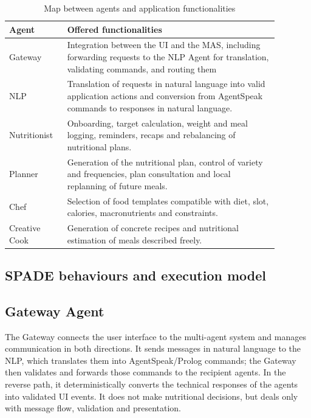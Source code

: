 \documentclass[12pt,a4paper]{article}
\newcommand{\toprule}{\hline}
\newcommand{\midrule}{\hline}
\newcommand{\bottomrule}{\hline}
\begin{document}
\begin{table}[H]
\centering
\begin{tabular}{p{0.18\linewidth}p{0.70\linewidth}}
\toprule
Agent & Offered functionalities \\
\midrule
Gateway
& Integration between the UI and the MAS, including forwarding requests to the NLP Agent for translation, validating commands, and routing them \\

NLP
& Translation of requests in natural language into valid
application actions and conversion from AgentSpeak commands to responses in natural language. \\

Nutritionist
& Onboarding, target calculation, weight and meal logging, reminders,
recaps and rebalancing of nutritional plans. \\

Planner
& Generation of the nutritional plan, control of variety and frequencies,
plan consultation and local replanning of future meals. \\

Chef
& Selection of food templates compatible with diet, slot, calories,
macronutrients and constraints. \\

Creative Cook
& Generation of concrete recipes and nutritional estimation of meals described
freely. \\

\bottomrule
\end{tabular}
\caption{Map between agents and application functionalities}
\end{table}


\subsection{SPADE behaviours and execution model}

\subsection{Gateway Agent}

The Gateway connects the user interface to the multi-agent system and manages communication in
both directions. It sends messages in natural language to the NLP, which translates them into
AgentSpeak/Prolog commands; the Gateway then validates and forwards those commands to the recipient
agents. In the reverse path, it deterministically converts the technical responses of the agents
into validated UI events. It does not make nutritional decisions, but deals only with message
flow, validation and presentation.
\end{document}
